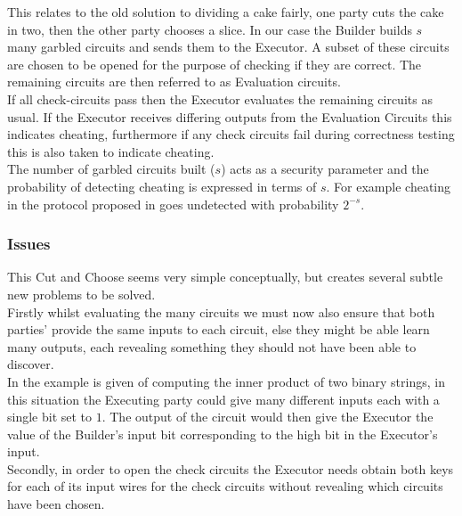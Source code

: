 \documentclass[ %
                    author={Nicholas Tutte},
                supervisor={Prof. Nigel Smart},
                    degree={MEng},
                     title={Secure Two Party Computation},
                  subtitle={A practical comparison of recent protocols},
                      type={Research - GG1K},
                      year={2015} ]{dissertation}
\begin{document}
				This relates to the old solution to dividing a cake fairly, one party cuts the cake in two, then the other party chooses a slice. In our case the Builder builds $s$ many garbled circuits and sends them to the Executor. A subset of these circuits are chosen to be opened for the purpose of checking if they are correct. The remaining circuits are then referred to as Evaluation circuits.\\

				If all check-circuits pass then the Executor evaluates the remaining circuits as usual. If the Executor receives differing outputs from the Evaluation Circuits this indicates cheating, furthermore if any check circuits fail during correctness testing this is also taken to indicate cheating.\\

				The number of garbled circuits built ($s$) acts as a security parameter and the probability of detecting cheating is expressed in terms of $s$. For example cheating in the protocol proposed in \cite{Lindell_CnC_2013} goes undetected with probability $2^{-s}$.\\

			\subsubsection{Issues}
				This Cut and Choose seems very simple conceptually, but creates several subtle new problems to be solved.\\

				{Firstly whilst evaluating the many circuits we must now also ensure that both parties' provide the same inputs to each circuit, else they might be able learn many outputs, each revealing something they should not have been able to discover.}\\

				In \cite{LindellAndPinkas2007} the example is given of computing the inner product of two binary strings, in this situation the Executing party could give many different inputs each with a single bit set to $1$. The output of the circuit would then give the Executor the value of the Builder's input bit corresponding to the high bit in the Executor's input.\\

				Secondly, in order to open the check circuits the Executor needs obtain both keys for each of its input wires for the check circuits without revealing which circuits have been chosen.\\
\end{document}
